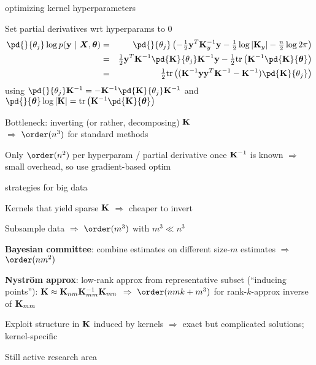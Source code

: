 \documentclass[11pt,compress,t,notes=noshow, xcolor=table]{beamer}
\begin{document}

\begin{framei}[sep=L]{optimizing kernel hyperparameters}
\item Set partial derivatives wrt hyperparams to 0
\begin{eqnarray*}
\pd{}{\theta_j}
\log p(\yv ~|~ \bm{X}, \thetav) &=& \pd{}{\theta_j}  \left(-\tfrac{1}{2}\yv^T\Ky^{-1} \yv - \tfrac{1}{2} \log \left| \Ky \right| - \tfrac{n}{2} \log 2\pi\right) \\ 
&=&\tfrac{1}{2} \yv^T \Kinv \pd{\Kmat}{\theta_j}\Kinv \yv - \tfrac{1}{2} \text{tr}\left(\Kinv \pd{\Kmat}{ \thetav} \right) \\
&=& \tfrac{1}{2} \text{tr}\left((\Kinv\yv\yv^T\Kinv - \Kinv)\pd{\Kmat}{\theta_j}\right)
\end{eqnarray*}
using $\pd{}{\theta_j} \Kinv = - \Kinv  \pd{\Kmat}{\theta_j}\Kinv$ and $\pd{}{\thetav} \log  |\Kmat| = \text{tr}\left(\Kinv \pd{\Kmat}{\thetav} \right)$
\item Bottleneck: inverting (or rather, decomposing) $\mathbf{K}$ \\$\Rightarrow$ $\order(n^3)$ for standard methods
\item Only $\order(n^2)$ per hyperparam / partial derivative once $\mathbf{K}^{-1}$ is known $\Rightarrow$ small overhead, so use gradient-based optim 
\end{framei}

\begin{framei}[sep=L]{strategies for big data}
\item Kernels that yield sparse $\mathbf{K}$ $\Rightarrow$ cheaper to invert
\item Subsample data $\Rightarrow$ $\order(m^3)$ with $m^3 \ll n^3$
\item \textbf{Bayesian committee}: combine estimates on different size-$m$ estimates $\Rightarrow$ $\order(nm^2)$
\item \textbf{Nyström approx}: low-rank approx from representative subset (``inducing points''): $\mathbf{K} \approx \mathbf{K}_{nm}\mathbf{K}_{mm}^{-1}\mathbf{K}_{mn}$ $\Rightarrow$ $\order(nmk + m^3)$ for rank-$k$-approx inverse of $\mathbf{K}_{mm}$
\item Exploit structure in $\mathbf{K}$ induced by kernels $\Rightarrow$ exact but complicated solutions; kernel-specific
\item Still active research area
\end{framei}

% 
% 
% 
% 
% 
% 

\endlecture
\end{document}
